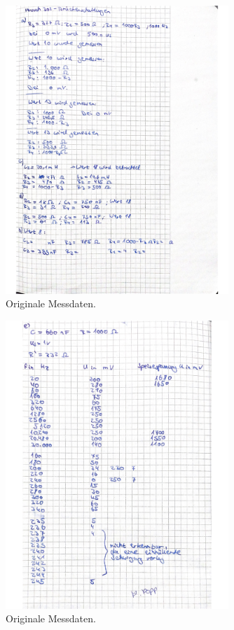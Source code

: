 \begin{figure}[H]
  \centering
  \includegraphics[width=0.75\textwidth]{dateien/daten1.jpg}
  \caption{Originale Messdaten.}
  \label{fig:daten1}
\end{figure}

\begin{figure}[H]
  \centering
  \includegraphics[width=0.75\textwidth]{dateien/daten2.jpg}
  \caption{Originale Messdaten.}
  \label{fig:daten2}
\end{figure}